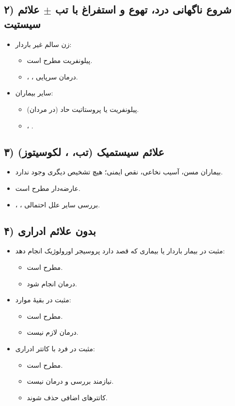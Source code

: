 \subsection*{۲) شروع ناگهانی درد، تهوع و استفراغ با تب $\pm$ علائم سیستیت}
\begin{itemize}
\item زن سالم غیر باردار:
\begin{itemize}
\item پیلونفریت مطرح است.
\item {}، ، درمان سرپایی.
\end{itemize}
\item سایر بیماران:
\begin{itemize}
\item پیلونفریت یا پروستاتیت حاد (در مردان).
\item {}، .
\end{itemize}
\end{itemize}

\subsection*{۳) علائم سیستمیک (تب، ، لکوسیتوز)}
\begin{itemize}
\item بیماران مسن، آسیب نخاعی، نقص ایمنی؛ هیچ تشخیص دیگری وجود ندارد.
\item {} عارضه‌دار مطرح است.
\item {}، ، بررسی سایر علل احتمالی.
\end{itemize}

\subsection*{۴) بدون علائم ادراری}
\begin{itemize}
\item {} مثبت در بیمار باردار یا بیماری که قصد دارد پروسیجر اورولوژیک انجام دهد:
\begin{itemize}
\item {} مطرح است.
\item درمان انجام شود.
\end{itemize}
\item {} مثبت در بقیهٔ موارد:
\begin{itemize}
\item {} مطرح است.
\item درمان لازم نیست.
\end{itemize}
\item {} مثبت در فرد با کاتتر ادراری:
\begin{itemize}
\item {} مطرح است.
\item نیازمند بررسی و درمان نیست.
\item کاتترهای اضافی حذف شوند.
\end{itemize}
\end{itemize}


